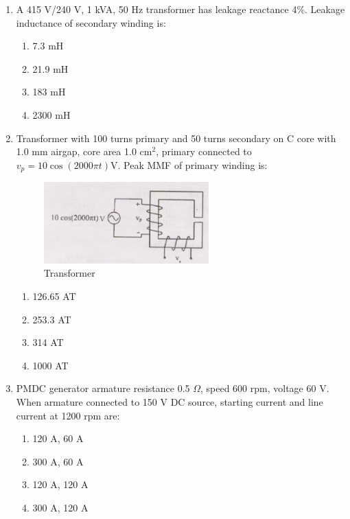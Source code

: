 \documentclass[journal,cmex10]{IEEEtran}
\theoremstyle{remark}
\numberwithin{equation}{enumi}
\numberwithin{figure}{enumi}
\begin{document}
\begin{enumerate}[label=\arabic*)]
    \item A 415 V/240 V, 1 kVA, 50 Hz transformer has leakage reactance 4\%. Leakage inductance of secondary winding is:
    \bigskip
    \hfill {}
    \begin{enumerate}[label=\alph*)]
        \item 7.3 mH
        \item 21.9 mH
        \item 183 mH
        \item 2300 mH
    \end{enumerate}
    \bigskip

    \item Transformer with 100 turns primary and 50 turns secondary on C core with 1.0 mm airgap, core area 1.0 cm$^2$, primary connected to $v_p=10\cos (2000\pi t)$V. Peak MMF of primary winding is:
   \begin{figure}[htbp]
  \centering
  \includegraphics[width=0.6\textwidth]{figs/C/fig6.png}
  \caption{Transformer}
  \label{C/fig6.png}
\end{figure}
    \bigskip
    \hfill {}
    \begin{enumerate}[label=\alph*)]
        \item 126.65 AT
        \item 253.3 AT
        \item 314 AT
        \item 1000 AT
    \end{enumerate}
    \bigskip

    \item PMDC generator armature resistance 0.5 $\Omega$, speed 600 rpm, voltage 60 V. When armature connected to 150 V DC source, starting current and line current at 1200 rpm are:
    \bigskip
    \hfill {}
    \begin{enumerate}[label=\alph*)]
        \item 120 A, 60 A
        \item 300 A, 60 A
        \item 120 A, 120 A
        \item 300 A, 120 A
    \end{enumerate}
    \newpage


\end{enumerate}
\end{document}
